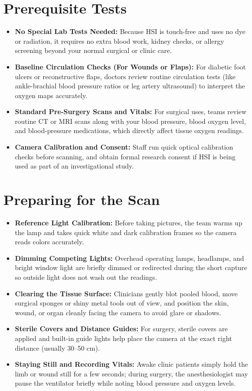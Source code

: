 \section{Prerequisite Tests}
\begin{itemize}
    \item \textbf{No Special Lab Tests Needed:} Because HSI is touch-free and uses no dye or radiation, it requires no extra blood work, kidney checks, or allergy screening beyond your normal surgical or clinic care.
    \item \textbf{Baseline Circulation Checks (For Wounds or Flaps):} For diabetic foot ulcers or reconstructive flaps, doctors review routine circulation tests (like ankle-brachial blood pressure ratios or leg artery ultrasound) to interpret the oxygen maps accurately.
    \item \textbf{Standard Pre-Surgery Scans and Vitals:} For surgical uses, teams review routine CT or MRI scans along with your blood pressure, blood oxygen level, and blood-pressure medications, which directly affect tissue oxygen readings.
    \item \textbf{Camera Calibration and Consent:} Staff run quick optical calibration checks before scanning, and obtain formal research consent if HSI is being used as part of an investigational study.
\end{itemize}

\section{Preparing for the Scan}
\begin{itemize}
    \item \textbf{Reference Light Calibration:} Before taking pictures, the team warms up the lamp and takes quick white and dark calibration frames so the camera reads colors accurately.
    \item \textbf{Dimming Competing Lights:} Overhead operating lamps, headlamps, and bright window light are briefly dimmed or redirected during the short capture so outside light does not wash out the readings.
    \item \textbf{Clearing the Tissue Surface:} Clinicians gently blot pooled blood, move surgical sponges or shiny metal tools out of view, and position the skin, wound, or organ cleanly facing the camera to avoid glare or shadows.
    \item \textbf{Sterile Covers and Distance Guides:} For surgery, sterile covers are applied and built-in guide lights help place the camera at the exact right distance (usually 30--50 cm).
    \item \textbf{Staying Still and Recording Vitals:} Awake clinic patients simply hold the limb or wound still for a few seconds; during surgery, the anesthesiologist may pause the ventilator briefly while noting blood pressure and oxygen levels.
\end{itemize}

